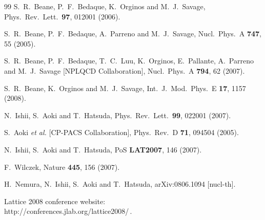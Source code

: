 \documentclass[aps,rmp,nofootinbib,twocolumn,floatfix]{revtex4}
\begin{document}
\begin{thebibliography}{99}
  S.~R.~Beane, P.~F.~Bedaque, K.~Orginos and M.~J.~Savage,
  Phys.\ Rev.\ Lett.\  {\bf 97}, 012001 (2006).

  S.~R.~Beane, P.~F.~Bedaque, A.~Parreno and M.~J.~Savage,
  Nucl.\ Phys.\  A {\bf 747}, 55 (2005).

  S.~R.~Beane, P.~F.~Bedaque, T.~C.~Luu, K.~Orginos, E.~Pallante, A.~Parreno and M.~J.~Savage
                  [NPLQCD Collaboration],
  Nucl.\ Phys.\  A {\bf 794}, 62 (2007).

  S.~R.~Beane, K.~Orginos and M.~J.~Savage,
  Int.\ J.\ Mod.\ Phys.\ E {\bf 17}, 1157 (2008).


  N.~Ishii, S.~Aoki and T.~Hatsuda,
  Phys.\ Rev.\ Lett.\  {\bf 99}, 022001 (2007).

  S.~Aoki {\it et al.}  [CP-PACS Collaboration],
  Phys.\ Rev.\  D {\bf 71}, 094504 (2005).

  N.~Ishii, S.~Aoki and T.~Hatsuda,
  PoS {\bf LAT2007}, 146 (2007).

F.~Wilczek, Nature {\bf 445}, 156 (2007).

  H.~Nemura, N.~Ishii, S.~Aoki and T.~Hatsuda,
  arXiv:0806.1094 [nucl-th].

Lattice 2008 conference website:\\ http://conferences.jlab.org/lattice2008/\,.


\end{thebibliography}
\end{document}
